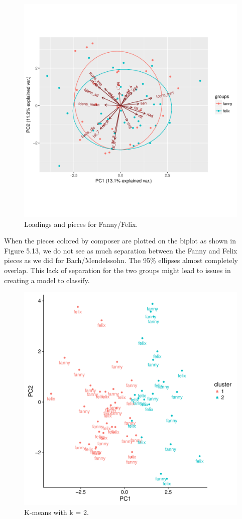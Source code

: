 \documentclass[12pt,twoside]{reedthesis}
\theoremstyle{definition}
\theoremstyle{definition}
\theoremstyle{definition}
\theoremstyle{remark}
\begin{document}
\begin{figure}[H]
\centering
\includegraphics[scale = .7]{images/bi_elipse_12_f.pdf}
\caption{Loadings and pieces for Fanny/Felix.}
\label{subd}
\end{figure}
When the pieces colored by composer are plotted on the biplot as shown
in Figure 5.13, we do not see as much separation between the Fanny and
Felix pieces as we did for Bach/Mendelssohn. The 95\% ellipses almost
completely overlap. This lack of separation for the two groups might
lead to issues in creating a model to classify.
\begin{figure}[H]
\centering
\includegraphics[scale = .7]{images/kmeans_2_f.pdf}
\caption{K-means with k = 2.}
\label{subd}
\end{figure}
\end{document}
